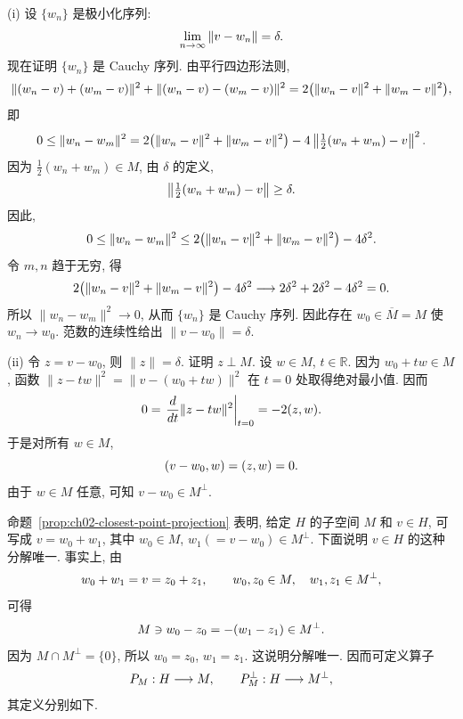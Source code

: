 \begin{Proof}
(i) 设 $\{w_n\}$ 是极小化序列:
\[
\MathBookFormulaID{formula-ch02-minimizing-sequence}
\lim_{n\to\infty}\|v-w_n\|=\delta.
\]
现在证明 $\{w_n\}$ 是 Cauchy 序列. 由平行四边形法则,
\[
\MathBookFormulaID{formula-ch02-projection-parallelogram-step}
\|(w_n-v)+(w_m-v)\|^2+\|(w_n-v)-(w_m-v)\|^2
=2\bigl(\|w_n-v\|^2+\|w_m-v\|^2\bigr),
\]
即
\[
\MathBookFormulaID{formula-ch02-projection-cauchy-bound}
0\leq\|w_n-w_m\|^2
=2\bigl(\|w_n-v\|^2+\|w_m-v\|^2\bigr)
-4\left\|\tfrac12(w_n+w_m)-v\right\|^2.
\]
因为 $\tfrac12(w_n+w_m)\in M$, 由 $\delta$ 的定义,
\[
\MathBookFormulaID{formula-ch02-midpoint-distance-bound}
\left\|\tfrac12(w_n+w_m)-v\right\|\geq\delta.
\]
因此,
\[
\MathBookFormulaID{formula-ch02-projection-cauchy-delta}
0\leq\|w_n-w_m\|^2
\leq2\bigl(\|w_n-v\|^2+\|w_m-v\|^2\bigr)-4\delta^2.
\]
令 $m,n$ 趋于无穷, 得
\[
\MathBookFormulaID{formula-ch02-projection-limit-zero}
2\bigl(\|w_n-v\|^2+\|w_m-v\|^2\bigr)-4\delta^2
\longrightarrow2\delta^2+2\delta^2-4\delta^2=0.
\]
所以 $\|w_n-w_m\|^2\to0$, 从而 $\{w_n\}$ 是 Cauchy 序列. 因此存在 $w_0\in\overline M=M$ 使 $w_n\to w_0$. 范数的连续性给出 $\|v-w_0\|=\delta$.

(ii) 令 $z=v-w_0$, 则 $\|z\|=\delta$. 证明 $z\perp M$. 设 $w\in M$, $t\in\mathbb R$. 因为 $w_0+tw\in M$, 函数 $\|z-tw\|^2=\|v-(w_0+tw)\|^2$ 在 $t=0$ 处取得绝对最小值. 因而
\[
\MathBookFormulaID{formula-ch02-projection-orthogonality-derivative}
0=\left.\frac{d}{dt}\|z-tw\|^2\right|_{t=0}=-2(z,w).
\]
于是对所有 $w\in M$,
\[
\MathBookFormulaID{formula-ch02-projection-orthogonality}
(v-w_0,w)=(z,w)=0.
\]
由于 $w\in M$ 任意, 可知 $v-w_0\in M^\perp$.
\end{Proof}

命题~\ref{prop:ch02-closest-point-projection} 表明, 给定 $H$ 的子空间 $M$ 和 $v\in H$, 可写成 $v=w_0+w_1$, 其中 $w_0\in M$, $w_1(=v-w_0)\in M^\perp$. 下面说明 $v\in H$ 的这种分解唯一. 事实上, 由
\[
\MathBookFormulaID{formula-ch02-decomposition-uniqueness-start}
w_0+w_1=v=z_0+z_1,
\qquad w_0,z_0\in M,\quad w_1,z_1\in M^\perp,
\]
可得
\[
\MathBookFormulaID{formula-ch02-decomposition-uniqueness-difference}
M\ni w_0-z_0=-(w_1-z_1)\in M^\perp.
\]
因为 $M\cap M^\perp=\{0\}$, 所以 $w_0=z_0$, $w_1=z_1$. 这说明分解唯一. 因而可定义算子
\setcounter{equation}{1}
\begin{equation}
\MathBookFormulaID{formula-ch02-projection-operators}
P_M:H\longrightarrow M,
\qquad P_M^\perp:H\longrightarrow M^\perp,
\label{eq:ch02-projection-operators}
\end{equation}
其定义分别如下.

